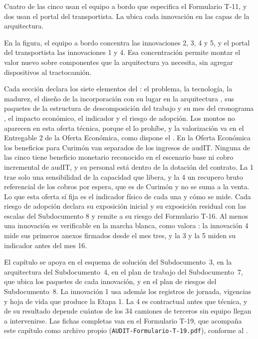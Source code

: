 Cuatro de las cinco usan el equipo a bordo que especifica el Formulario T-11, y dos usan el portal del
transportista. La  ubica cada innovación en las capas de la arquitectura.


En la figura, el equipo a bordo concentra las innovaciones 2, 3, 4 y 5, y el portal del transportista
las innovaciones 1 y 4. Esa concentración permite montar el valor nuevo sobre componentes que la
arquitectura ya necesita, sin agregar dispositivos al tractocamión.

Cada sección declara los siete elementos del : el problema, la tecnología, la madurez, el
diseño de la incorporación con su lugar en la arquitectura , sus paquetes de la
estructura de descomposición del trabajo y su mes del cronograma , el impacto
económico, el indicador y el riesgo de adopción. Los montos no aparecen en esta oferta técnica, porque
el  lo prohíbe, y la valorización va en el Entregable 2 de la Oferta Económica, como
dispone el . En la Oferta Económica los beneficios para Curimón van separados de los
ingresos de audIT. Ninguna de las cinco tiene beneficio monetario reconocido en el escenario base ni
cobro incremental de audIT, y su personal está dentro de la dotación del contrato. La 1 trae solo una
sensibilidad de la capacidad que libera, y la 4 un recupero bruto referencial de los cobros por espera,
que es de Curimón y no se suma a la venta. Lo que
esta oferta sí fija es el indicador físico de cada una y cómo se mide. Cada riesgo de adopción declara
su exposición inicial y su exposición residual con las escalas del Subdocumento 8 y remite a su riesgo
del Formulario T-16. Al menos una innovación es verificable en la marcha blanca, como valora
: la innovación 4 mide sus primeros anexos firmados desde el mes tres, y la 3 y
la 5 miden su indicador antes del mes 16.

El capítulo se apoya en el esquema de solución del Subdocumento~3, en la arquitectura del
Subdocumento~4, en el plan de trabajo del Subdocumento~7, que ubica los paquetes de cada innovación, y
en el plan de riesgos del Subdocumento~8. La innovación 1 usa además los registros de jornada, vigencias y
hoja de vida que produce la Etapa 1. La 4 es contractual antes que técnica, y de su resultado depende cuántos de los 34
camiones de terceros sin equipo llegan a intervenirse. Las fichas completas van en el Formulario T-19, que acompaña
este capítulo como archivo propio (\texttt{AUDIT-Formulario-T-19.pdf}), conforme al
.

